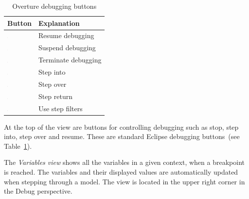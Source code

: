 \begin{table}
\begin{center}
\begin{tabular}{|l|l|}\hline \hline
\textbf{Button} & \textbf{Explanation} \\ \hline
\includegraphics[width=0.03\textwidth]{figures/resume} & Resume debugging \\
\includegraphics[width=0.03\textwidth]{figures/suspend} & Suspend debugging\\
\includegraphics[width=0.03\textwidth]{figures/terminate} & Terminate debugging\\
\includegraphics[width=0.03\textwidth]{figures/stepinto} & Step into\\
\includegraphics[width=0.03\textwidth]{figures/stepover} & Step over \\
\includegraphics[width=0.03\textwidth]{figures/stepreturn} & Step return\\
\includegraphics[width=0.03\textwidth]{figures/stepbystep} & Use step filters\\
\hline \hline
\end{tabular}
\caption{Overture debugging buttons\label{tab:debugButtons}}
\end{center}
\end{table}

At the top of the view are buttons for controlling debugging such as stop, step
into, step over and resume. These are standard Eclipse debugging
buttons~(see Table~\ref{tab:debugButtons}).

The \emph{Variables view} shows all the variables in a given context,
when a breakpoint is reached. The variables and their displayed values
are automatically updated when stepping through a model. The view is
located in the upper right corner in the Debug perspective.


